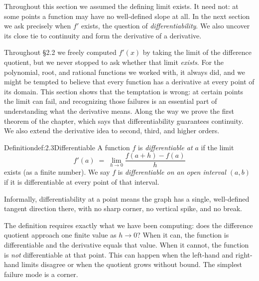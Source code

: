 \documentclass[a4paper,12pt,oneside]{memoir}
\begin{document}
Throughout this section we assumed the defining limit exists. It need not: at some points a function may have no well-defined slope at all. In the next section we ask precisely when \(f'\) exists, the question of \emph{differentiability}. We also uncover its close tie to continuity and form the derivative of a derivative.


Throughout §2.2 we freely computed \(f'(x)\) by taking the limit of the difference quotient, but we never stopped to ask whether that limit \emph{exists}. For the polynomial, root, and rational functions we worked with, it always did, and we might be tempted to believe that every function has a derivative at every point of its domain. This section shows that the temptation is wrong: at certain points the limit can fail, and recognizing those failures is an essential part of understanding what the derivative means. Along the way we prove the first theorem of the chapter, which says that differentiability guarantees continuity. We also extend the derivative idea to second, third, and higher orders.

\begin{envdefinition}{Definition}{def:2.3}{Differentiable}
A function \(f\) is \emph{differentiable at \(a\)} if the limit \[ f'(a) \;=\; \lim_{h \to 0} \frac{f(a + h) - f(a)}{h} \] exists (as a finite number). We say \(f\) is \emph{differentiable on an open interval \((a, b)\)} if it is differentiable at every point of that interval.

\begin{informal}
Informally, differentiability at a point means the graph has a single, well-defined tangent direction there, with no sharp corner, no vertical spike, and no break.
\end{informal}
\end{envdefinition}
The definition requires exactly what we have been computing: does the difference quotient approach one finite value as \(h \to 0\)? When it can, the function is differentiable and the derivative equals that value. When it cannot, the function is \emph{not} differentiable at that point. This can happen when the left-hand and right-hand limits disagree or when the quotient grows without bound. The simplest failure mode is a corner.
\end{document}
